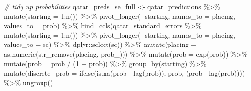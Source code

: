 \documentclass[
]{book}
\newenvironment{Shaded}{\begin{snugshade}}{\end{snugshade}}
\newcommand{\AttributeTok}[1]{\textcolor[rgb]{0.77,0.63,0.00}{#1}}
\newcommand{\CommentTok}[1]{\textcolor[rgb]{0.56,0.35,0.01}{\textit{#1}}}
\newcommand{\DecValTok}[1]{\textcolor[rgb]{0.00,0.00,0.81}{#1}}
\newcommand{\FunctionTok}[1]{\textcolor[rgb]{0.00,0.00,0.00}{#1}}
\newcommand{\NormalTok}[1]{#1}
\newcommand{\OtherTok}[1]{\textcolor[rgb]{0.56,0.35,0.01}{#1}}
\newcommand{\SpecialCharTok}[1]{\textcolor[rgb]{0.00,0.00,0.00}{#1}}
\newcommand{\StringTok}[1]{\textcolor[rgb]{0.31,0.60,0.02}{#1}}
\begin{document}
\begin{Shaded}
\begin{Highlighting}[]
\CommentTok{\# tidy up probabilities}
\NormalTok{qatar\_preds\_se\_full }\OtherTok{\textless{}{-}}\NormalTok{ qatar\_predictions }\SpecialCharTok{\%\textgreater{}\%}
  \FunctionTok{mutate}\NormalTok{(}\AttributeTok{starting =} \DecValTok{1}\SpecialCharTok{:}\FunctionTok{n}\NormalTok{()) }\SpecialCharTok{\%\textgreater{}\%}
  \FunctionTok{pivot\_longer}\NormalTok{(}\SpecialCharTok{{-}}\NormalTok{ starting, }\AttributeTok{names\_to =} \StringTok{\textquotesingle{}placing\textquotesingle{}}\NormalTok{, }\AttributeTok{values\_to =} \StringTok{\textquotesingle{}prob\textquotesingle{}}\NormalTok{) }\SpecialCharTok{\%\textgreater{}\%} 
  \FunctionTok{bind\_cols}\NormalTok{(qatar\_standard\_errors }\SpecialCharTok{\%\textgreater{}\%} \FunctionTok{mutate}\NormalTok{(}\AttributeTok{starting =} \DecValTok{1}\SpecialCharTok{:}\FunctionTok{n}\NormalTok{()) }\SpecialCharTok{\%\textgreater{}\%}
  \FunctionTok{pivot\_longer}\NormalTok{(}\SpecialCharTok{{-}}\NormalTok{ starting, }\AttributeTok{names\_to =} \StringTok{\textquotesingle{}placing\textquotesingle{}}\NormalTok{, }\AttributeTok{values\_to =} \StringTok{\textquotesingle{}se\textquotesingle{}}\NormalTok{) }\SpecialCharTok{\%\textgreater{}\%}
\NormalTok{    dplyr}\SpecialCharTok{::}\FunctionTok{select}\NormalTok{(se)) }\SpecialCharTok{\%\textgreater{}\%}
  \FunctionTok{mutate}\NormalTok{(}\AttributeTok{placing =} \FunctionTok{as.numeric}\NormalTok{(}\FunctionTok{str\_remove}\NormalTok{(placing, }\StringTok{\textquotesingle{}prob\_\textquotesingle{}}\NormalTok{))) }\SpecialCharTok{\%\textgreater{}\%}
  \FunctionTok{mutate}\NormalTok{(}\AttributeTok{prob =} \FunctionTok{exp}\NormalTok{(prob)) }\SpecialCharTok{\%\textgreater{}\%}
  \FunctionTok{mutate}\NormalTok{(}\AttributeTok{prob =}\NormalTok{ prob }\SpecialCharTok{/}\NormalTok{ (}\DecValTok{1} \SpecialCharTok{+}\NormalTok{ prob)) }\SpecialCharTok{\%\textgreater{}\%}
  \FunctionTok{group\_by}\NormalTok{(starting) }\SpecialCharTok{\%\textgreater{}\%} 
  \FunctionTok{mutate}\NormalTok{(}\AttributeTok{discrete\_prob =} \FunctionTok{ifelse}\NormalTok{(}\FunctionTok{is.na}\NormalTok{(prob }\SpecialCharTok{{-}} \FunctionTok{lag}\NormalTok{(prob)), prob, (prob }\SpecialCharTok{{-}} \FunctionTok{lag}\NormalTok{(prob)))) }\SpecialCharTok{\%\textgreater{}\%}
  \FunctionTok{ungroup}\NormalTok{()}


\end{Highlighting}
\end{Shaded}
\end{document}
